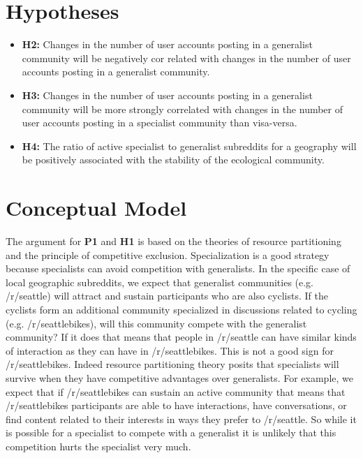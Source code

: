 \documentclass[12pt]{memoir}
\begin{document}
\section{Hypotheses}
\begin{itemize}



\item \textbf{H2:} Changes in the number of user accounts posting in a generalist community will be negatively cor
related with changes in the number of user accounts posting in a generalist community.

\item \textbf{H3:} Changes in the number of user accounts posting in a generalist community will be more strongly correlated with changes in the number of user accounts posting in a specialist community than visa-versa.

\item \textbf{H4:} The ratio of active specialist to generalist subreddits for a geography will be positively associated with the stability of the ecological community.

\end{itemize}

\section{Conceptual Model}

\label{sec:conc-modeld}

The argument for \textbf{P1} and \textbf{H1} is based on the theories of resource partitioning and the principle of competitive exclusion.  Specialization is a good strategy because specialists can avoid competition with generalists.  In the specific case of local geographic subreddits, we expect that generalist communities (e.g. /r/seattle) will attract and sustain participants who are also cyclists.  If the cyclists form an additional community specialized in discussions related to cycling (e.g. /r/seattlebikes), will this community compete with the generalist community? If it does that means that people in /r/seattle can have similar kinds of interaction as they can have in  /r/seattlebikes.  This is not a good sign for /r/seattlebikes.  Indeed resource partitioning theory posits that specialists will survive when they have competitive advantages over generalists.  For example, we expect that if /r/seattlebikes can sustain an active community that means that /r/seattlebikes participants are able to have interactions, have conversations, or find content related to their interests in ways they prefer to /r/seattle.  So while it is possible for a specialist to compete with a generalist it is unlikely that this competition hurts the specialist very much.
\end{document}

